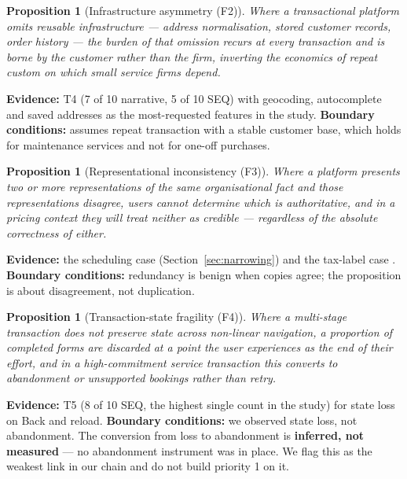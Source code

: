 \documentclass[]{interact}
\theoremstyle{plain}
\newtheorem{proposition}[section]{Proposition}
\begin{document}
\begin{proposition}[Infrastructure asymmetry (F2)]
\label{prop:F2}
\emph{Where a transactional platform omits reusable infrastructure --- address normalisation, stored
customer records, order history --- the burden of that omission recurs at every transaction and is borne
by the customer rather than the firm, inverting the economics of repeat custom on which small service
firms depend.}
\end{proposition}

\noindent\textbf{Evidence:} T4 (7 of 10 narrative, 5 of 10 SEQ) with geocoding, autocomplete and saved
addresses as the most-requested features in the study. \textbf{Boundary conditions:} assumes repeat
transaction with a stable customer base, which holds for maintenance services and not for one-off
purchases.

\begin{proposition}[Representational inconsistency (F3)]
\label{prop:F3}
\emph{Where a platform presents two or more representations of the same organisational fact and those
representations disagree, users cannot determine which is authoritative, and in a pricing context they
will treat neither as credible --- regardless of the absolute correctness of either.}
\end{proposition}

\noindent\textbf{Evidence:} the scheduling case (Section~\ref{sec:narrowing}) and the tax-label case
\citep{braniwati2026price}. \textbf{Boundary conditions:} redundancy is benign when copies agree; the
proposition is about disagreement, not duplication.

\begin{proposition}[Transaction-state fragility (F4)]
\label{prop:F4}
\emph{Where a multi-stage transaction does not preserve state across non-linear navigation, a
proportion of completed forms are discarded at a point the user experiences as the end of their effort,
and in a high-commitment service transaction this converts to abandonment or unsupported bookings rather
than retry.}
\end{proposition}

\noindent\textbf{Evidence:} T5 (8 of 10 SEQ, the highest single count in the study) for state loss on
Back and reload. \textbf{Boundary conditions:} we observed state loss, not abandonment. The conversion
from loss to abandonment is \textbf{inferred, not measured} --- no abandonment instrument was in place.
We flag this as the weakest link in our chain and do not build priority 1 on it.
\end{document}

